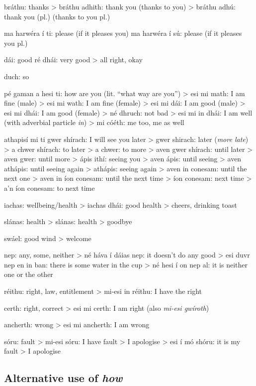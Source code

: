 br\'{a}thu: thanks
> br\'{a}thu adhith: thank you (thanks to you)
> br\'{a}thu adh\'{u}: thank you (pl.) (thanks to you pl.)

ma harw\'{e}ra \'{i} ti: please (if it pleases you)
ma harw\'{e}ra \'{i} s\'{u}: please (if it pleases you pl.)

d\'{a}i: good
r\'{e} dh\'{a}i: very good
> all right, okay

duch: so

p\'{e} gaman a hesi ti: how are you (lit. ``what way are you'')
> esi mi math: I am fine (male)
> esi mi wath: I am fine (female)
> esi mi d\'{a}i: I am good (male)
> esi mi dh\'{a}i: I am good (female)
> n\'{e} dhruch: not bad
> esi mi in dh\'{a}i: I am well (with adverbial particle \textit{in})
> mi c\'{o}\'{e}th: me too, me as well

athapis\'{i} mi ti gwer sh\'{i}rach: I will see you later
> gwer shirach: later (\textit{more late})
> a chwer sh\'{i}rach: to later
> a chwer: to more
> aven gwer sh\'{i}rach: until later
> aven gwer: until more
> \'{a}pis ith\'{i}: seeing you
> aven \'{a}pis: until seeing
> aven ath\'{a}pis: until seeing again
> ath\'{a}pis: seeing again
> aven in conesam: until the next one
> aven in \'{i}on conesam: until the next time
> \'{i}on conesam: next time
> a'n \'{i}on conesam: to next time

iachas: wellbeing/health
> iachas dh\'{a}i: good health > cheers, drinking toast

sl\'{a}nas: health
> sl\'{a}nas: health > goodbye

sw\'{a}el: good wind > welcome

nep: any, some, neither
> n\'{e} h\'{a}va \'{i} d\'{a}ias nep: it doesn't do any good
> esi duvr nep en in ban: there is some water in the cup
> n\'{e} hesi \'{i} on nep al: it is neither one or the other

r\'{e}ithu: right, law, entitlement
> mi-esi in r\'{e}ithu: I have the right

certh: right, correct
> esi mi certh: I am right (also \textit{mi-esi gw\'{i}roth})

ancherth: wrong
> esi mi ancherth: I am wrong

s\'{o}ru: fault
> mi-esi s\'{o}ru: I have fault > I apologise
> esi \'{i} m\'{o} sh\'{o}ru: it is my fault > I apologise

\subsection{Alternative use of \textit{how}}

